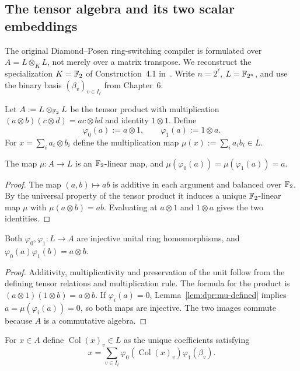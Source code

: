 \subsection{The tensor algebra and its two scalar embeddings}\label{sec:dpr:tensor}
The original Diamond--Posen ring-switching compiler
is formulated over $A=L\otimes_KL$, not merely
over a matrix transpose. We reconstruct the
specialization $K=\mathbb{F}_2$ of Construction~4.1
in~\cite{DiamondPosen2024}. Write
$n=2^\ell$, $L=\mathbb{F}_{2^n}$, and use the
binary basis $(\beta_v)_{v\in I_\ell}$ from Chapter~6.

\begin{definition}\label{def:dpr:embeddings}
Let $A:=L\otimes_{\mathbb{F}_2}L$ be the tensor product
with multiplication
$(a\otimes b)(c\otimes d)=ac\otimes bd$
and identity $1\otimes1$. Define
\[
 \varphi_0(a):=a\otimes1,\qquad
 \varphi_1(a):=1\otimes a.
\]
For $x=\sum_{i}a_i\otimes b_i$ define
the multiplication map
$\mu(x):=\sum_i a_ib_i\in L$.
\end{definition}

\begin{lemma}\label{lem:dpr:mu-defined}
The map $\mu:A\to L$ is an $\mathbb{F}_2$-linear map,
and $\mu(\varphi_0(a))=\mu(\varphi_1(a))=a$.
\end{lemma}
\begin{proof}
The map $(a,b)\mapsto ab$ is additive
in each argument and balanced over $\mathbb{F}_2$.
By the universal property of the tensor
product it induces a unique $\mathbb{F}_2$-linear
map $\mu$ with $\mu(a\otimes b)=ab$.
Evaluating at $a\otimes1$ and $1\otimes a$
gives the two identities.
\end{proof}

\begin{lemma}\label{lem:dpr:phi-embed}
Both $\varphi_0,\varphi_1:L\to A$
are injective unital ring homomorphisms,
and $\varphi_0(a)\varphi_1(b)=a\otimes b$.
\end{lemma}
\begin{proof}
Additivity, multiplicativity and preservation
of the unit follow from the defining tensor
relations and multiplication rule.
The formula for the product is
$(a\otimes1)(1\otimes b)=a\otimes b$.
If $\varphi_i(a)=0$, Lemma~\ref{lem:dpr:mu-defined}
implies $a=\mu(\varphi_i(a))=0$,
so both maps are injective.
The two images commute because $A$
is a commutative algebra.
\end{proof}

\begin{definition}\label{def:dpr:column}
For $x\in A$ define $\operatorname{Col}(x)_v\in L$
as the unique coefficients satisfying
\[
 \boxed{x=\sum_{v\in I_\ell}
   \varphi_0(\operatorname{Col}(x)_v)
   \varphi_1(\beta_v).}
\]
\end{definition}

